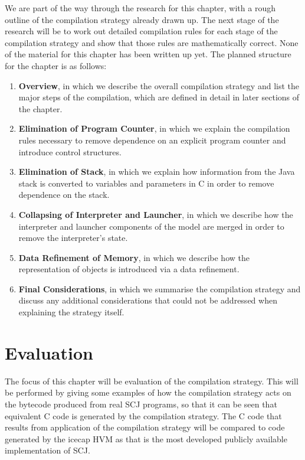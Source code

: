 \documentclass[a4paper,10pt]{report}
\let\olditem\item
\renewcommand{\item}[1][]{\olditem{\bfseries #1}}
\begin{document}
We are part of the way through the research for this chapter, with a
rough outline of the compilation strategy already drawn up.
The next stage of the research will be to work out detailed
compilation rules for each stage of the compilation strategy and show
that those rules are mathematically correct.
None of the material for this chapter has been written up yet.
The planned structure for the chapter is as follows:
\begin{enumerate}
\item[Overview], in which we describe the overall compilation strategy
  and list the major steps of the compilation, which are defined in
  detail in later sections of the chapter.
\item[Elimination of Program Counter], in which we explain the
  compilation rules necessary to remove dependence on an explicit
  program counter and introduce control structures.
\item[Elimination of Stack], in which we explain how information from
  the Java stack is converted to variables and parameters in C in
  order to remove dependence on the stack.
\item[Collapsing of Interpreter and Launcher], in which we describe
  how the interpreter and launcher components of the model are merged
  in order to remove the interpreter's state.
\item[Data Refinement of Memory], in which we describe how the
  representation of objects is introduced via a data refinement.
\item[Final Considerations], in which we summarise the compilation
  strategy and discuss any additional considerations that could not be
  addressed when explaining the strategy itself.
\end{enumerate}

\section{Evaluation}

The focus of this chapter will be evaluation of the compilation
strategy.
This will be performed by giving some examples of how the
compilation strategy acts on the bytecode produced from real SCJ
programs, so that it can be seen that equivalent C code is generated
by the compilation strategy.
The C code that results from application of the compilation strategy
will be compared to code generated by the icecap HVM as that is the
most developed publicly available implementation of SCJ.
\end{document}

